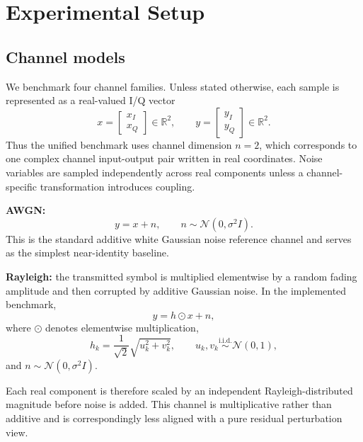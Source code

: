 \documentclass[conference]{IEEEtran}
\begin{document}
\section{Experimental Setup}
\subsection{Channel models}
We benchmark four channel families.
Unless stated otherwise, each sample is represented as a real-valued I/Q vector
\begin{equation}
x = \begin{bmatrix}x_I \\ x_Q\end{bmatrix} \in \mathbb{R}^2,
\qquad
y = \begin{bmatrix}y_I \\ y_Q\end{bmatrix} \in \mathbb{R}^2.
\end{equation}
Thus the unified benchmark uses channel dimension \(n=2\), which corresponds to one complex channel input-output pair written in real coordinates.
Noise variables are sampled independently across real components unless a channel-specific transformation introduces coupling.

\textbf{AWGN:}
\begin{equation}
y = x + n,
\qquad
n \sim \mathcal{N}(0,\sigma^2 I).
\end{equation}
This is the standard additive white Gaussian noise reference channel and serves as the simplest near-identity baseline.

\textbf{Rayleigh:}
the transmitted symbol is multiplied elementwise by a random fading amplitude and then corrupted by additive Gaussian noise.
In the implemented benchmark,
\begin{equation}
y = h \odot x + n,
\end{equation}
where \(\odot\) denotes elementwise multiplication,
\begin{equation}
h_k = \frac{1}{\sqrt{2}}\sqrt{u_k^2 + v_k^2},
\qquad
u_k,v_k \overset{\text{i.i.d.}}{\sim} \mathcal{N}(0,1),
\end{equation}
and $n \sim \mathcal{N}(0,\sigma^2 I).$

Each real component is therefore scaled by an independent Rayleigh-distributed magnitude before noise is added.
This channel is multiplicative rather than additive and is correspondingly less aligned with a pure residual perturbation view.
\end{document}
